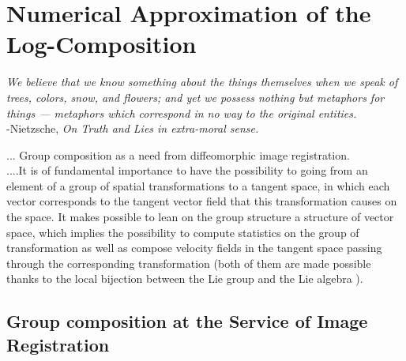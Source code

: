 \chapter{Numerical Approximation of the Log-Composition}\label{ch:application_log_composition}

\begin{flushright}
	\emph{We believe that we know something about the things themselves when we speak of trees, colors, snow, and flowers; and yet we possess nothing but metaphors for things — metaphors which correspond in no way to the original entities.} \\ -Nietzsche, \emph{On Truth and Lies in extra-moral sense.}
\end{flushright}

... Group composition as a need from diffeomorphic image registration.\\
....It is of fundamental importance to have the possibility to going from an element of a group of spatial transformations  to a tangent space, in which each vector corresponds to the tangent vector field that this transformation causes on the space. It makes possible to lean on the group structure a structure of vector space, which implies the possibility to compute statistics on the group of transformation as well as compose velocity fields in the tangent space passing through the corresponding transformation (both of them are made possible thanks to the local bijection between the Lie group and the Lie algebra ). \\

\section{Group composition at the Service of Image Registration}




